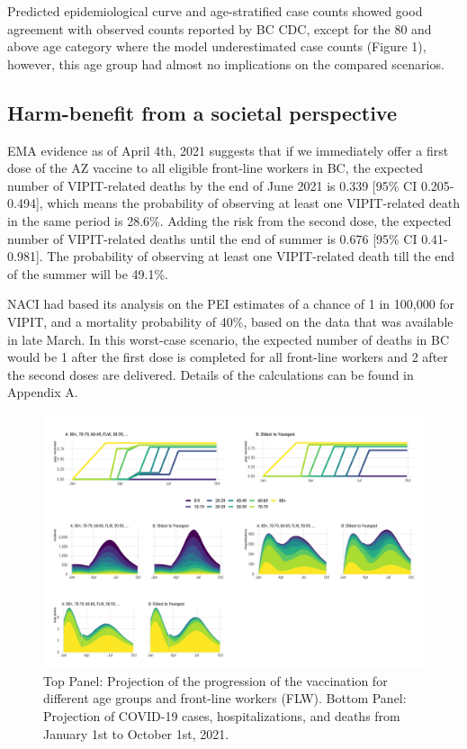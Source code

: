 \documentclass[]{interact}
\theoremstyle{plain}%
\theoremstyle{definition}
\theoremstyle{remark}
\begin{document}
Predicted epidemiological curve and age-stratified case counts showed
good agreement with observed counts reported by BC CDC, except for the
80 and above age category where the model underestimated case counts
(Figure 1), however, this age group had almost no implications on the
compared scenarios.

\hypertarget{harm-benefit-from-a-societal-perspective}{%
\subsection{Harm-benefit from a societal
perspective}\label{harm-benefit-from-a-societal-perspective}}

EMA evidence as of April 4th, 2021 suggests that if we immediately offer
a first dose of the AZ vaccine to all eligible front-line workers in BC,
the expected number of VIPIT-related deaths by the end of June 2021 is
0.339 {[}95\% CI 0.205-0.494{]}, which means the probability of
observing at least one VIPIT-related death in the same period is 28.6\%.
Adding the risk from the second dose, the expected number of
VIPIT-related deaths until the end of summer is 0.676 {[}95\% CI
0.41-0.981{]}. The probability of observing at least one VIPIT-related
death till the end of the summer will be 49.1\%.

NACI had based its analysis on the PEI estimates of a chance of 1 in
100,000 for VIPIT, and a mortality probability of 40\%, based on the
data that was available in late March. In this worst-case scenario, the
expected number of deaths in BC would be 1 after the first dose is
completed for all front-line workers and 2 after the second doses are
delivered. Details of the calculations can be found in Appendix A.

\begin{figure}

{\centering \includegraphics[width=1\linewidth]{../figures/fig-trajectoriesFull} 

}

\caption{Top Panel: Projection of the progression of the vaccination for different age groups and front-line workers (FLW). Bottom Panel: Projection of COVID-19 cases, hospitalizations, and deaths from January 1st to October 1st, 2021.}\label{fig:fig1}
\end{figure}
\end{document}

